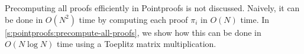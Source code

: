 Precomputing all proofs efficiently in Pointproofs is not discussed.
Naively, it can be done in $O(N^2)$ time by computing each proof $\pi_i$ in $O(N)$ time.
In \cref{s:pointproofs:precompute-all-proofs}, we show how this can be done in $O(N\log{N})$ time using a Toeplitz matrix multiplication.
